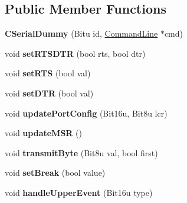 \subsection*{Public Member Functions}
\begin{DoxyCompactItemize}
\item 
\hypertarget{classCSerialDummy_a05d909b4dc17f6e6014a805aac7c9f4a}{{\bfseries C\-Serial\-Dummy} (Bitu id, \hyperlink{classCommandLine}{Command\-Line} $\ast$cmd)}\label{classCSerialDummy_a05d909b4dc17f6e6014a805aac7c9f4a}

\item 
\hypertarget{classCSerialDummy_a6e064c483f43712d8f69f66d5b218319}{void {\bfseries set\-R\-T\-S\-D\-T\-R} (bool rts, bool dtr)}\label{classCSerialDummy_a6e064c483f43712d8f69f66d5b218319}

\item 
\hypertarget{classCSerialDummy_afadb9aae302c8af5d1ed154dc539ec4b}{void {\bfseries set\-R\-T\-S} (bool val)}\label{classCSerialDummy_afadb9aae302c8af5d1ed154dc539ec4b}

\item 
\hypertarget{classCSerialDummy_a9d53d1aa9b9687daa82400ad547f840b}{void {\bfseries set\-D\-T\-R} (bool val)}\label{classCSerialDummy_a9d53d1aa9b9687daa82400ad547f840b}

\item 
\hypertarget{classCSerialDummy_a88d1b286e5f1c15542695c6e46fdea1a}{void {\bfseries update\-Port\-Config} (Bit16u, Bit8u lcr)}\label{classCSerialDummy_a88d1b286e5f1c15542695c6e46fdea1a}

\item 
\hypertarget{classCSerialDummy_ad1028cc338b1953a5ff523d27612b7b7}{void {\bfseries update\-M\-S\-R} ()}\label{classCSerialDummy_ad1028cc338b1953a5ff523d27612b7b7}

\item 
\hypertarget{classCSerialDummy_a58c1bc29f5da43b7555f929f380c99be}{void {\bfseries transmit\-Byte} (Bit8u val, bool first)}\label{classCSerialDummy_a58c1bc29f5da43b7555f929f380c99be}

\item 
\hypertarget{classCSerialDummy_ab31dd7f543292b21ed7638633e42545f}{void {\bfseries set\-Break} (bool value)}\label{classCSerialDummy_ab31dd7f543292b21ed7638633e42545f}

\item 
\hypertarget{classCSerialDummy_add60c11dcf6b9e666797216ce40da736}{void {\bfseries handle\-Upper\-Event} (Bit16u type)}\label{classCSerialDummy_add60c11dcf6b9e666797216ce40da736}

\end{DoxyCompactItemize}


